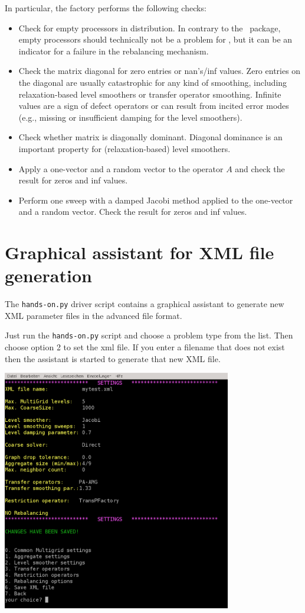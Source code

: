 \documentclass[10pt,fleqn]{book}
\begin{document}
In particular, the factory performs the following checks:
\begin{itemize}
\item Check for empty processors in distribution. In contrary to the \ml~package, empty processors should technically not be a problem for \muelu, but it can be an indicator for a failure in the rebalancing mechanism.
\item Check the matrix diagonal for zero entries or nan's/inf values. Zero entries on the diagonal are usually catastrophic for any kind of smoothing, including relaxation-based level smoothers or transfer operator smoothing. Infinite values are a sign of defect operators or can result from incited error modes (e.g., missing or insufficient damping for the level smoothers).
\item Check whether matrix is diagonally dominant. Diagonal dominance is an important property for (relaxation-based) level smoothers.
\item Apply a one-vector and a random vector to the operator $A$ and check the result for zeros and inf values.
\item Perform one sweep with a damped Jacobi method applied to the one-vector and a random vector. Check the result for zeros and inf values.
\end{itemize}

\section{Graphical assistant for XML file generation}

The \verb|hands-on.py| driver script contains a graphical assistant to generate new XML parameter files in the advanced \muelu file format.

Just run the \verb|hands-on.py| script and choose a problem type from the list. Then choose option 2 to set the xml file. If you enter a filename that does not exist then the assistant is started to generate that new XML file.

\begin{center}\includegraphics[width=10cm]{pics/tut1_15.png} \end{center}
\end{document}
